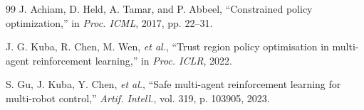 \documentclass[letterpaper, 10 pt, conference]{ieeeconf}
\begin{document}
\begin{thebibliography}{99}
J. Achiam, D. Held, A. Tamar, and P. Abbeel, ``Constrained policy optimization,'' in \emph{Proc. ICML}, 2017, pp. 22--31.

J. G. Kuba, R. Chen, M. Wen, \emph{et al.}, ``Trust region policy optimisation in multi-agent reinforcement learning,'' in \emph{Proc. ICLR}, 2022.

S. Gu, J. Kuba, Y. Chen, \emph{et al.}, ``Safe multi-agent reinforcement learning for multi-robot control,'' \emph{Artif. Intell.}, vol. 319, p. 103905, 2023.

\end{thebibliography}
\end{document}

